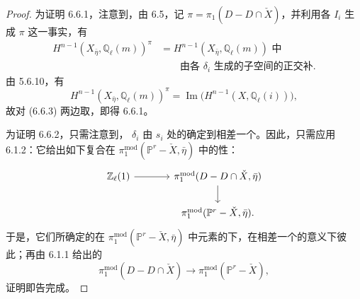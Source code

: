 \begin{proof}
为证明 6.6.1，注意到，由 6.5，记 $\pi=\pi_1(D-D\cap\check X)$，并利用各 $I_i$ 生成 $\pi$ 这一事实，有
\[
\begin{aligned}
H^{n-1}(X_{\bar\eta},\mathbb Q_\ell(m))^\pi
&=\text{$H^{n-1}(X_{\bar\eta},\mathbb Q_\ell(m))$ 中}\\
&\qquad\text{由各 $\delta_i$ 生成的子空间的正交补}.
\end{aligned}
\tag{6.6.3}
\]
由 5.6.10，有
\[
H^{n-1}(X_{\bar\eta},\mathbb Q_\ell(m))^\pi
=\operatorname{Im}\bigl(H^{n-1}(X,\mathbb Q_\ell(i))\bigr),
\tag{6.6.4}
\]
故对 (6.6.3) 两边取，即得 6.6.1。

为证明 6.6.2，只需注意到， $\delta_i$ 由 $s_i$ 处的确定到相差一个。因此，只需应用 6.1.2：它给出如下复合在 $\pi_1^{\mathrm{mod}}(\mathbb P^r-\check X,\bar\eta)$ 中的性：
\[
\begin{tikzcd}[column sep=large]
\mathbb Z_\ell(1)\arrow[r]&\pi_1^{\mathrm{mod}}(D-D\cap\check X,\bar\eta)\arrow[d]\\
&\pi_1^{\mathrm{mod}}(\mathbb P^r-\check X,\bar\eta).
\end{tikzcd}
\]
于是，它们所确定的在 $\pi_1^{\mathrm{mod}}(\mathbb P^r-\check X,\bar\eta)$ 中元素的下，在相差一个的意义下彼此；再由 6.1.1 给出的
\[
\pi_1^{\mathrm{mod}}(D-D\cap\check X)\longrightarrow\pi_1^{\mathrm{mod}}(\mathbb P^r-\check X),
\]
证明即告完成。
\end{proof}

